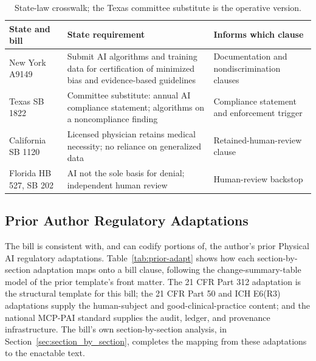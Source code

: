 \begin{table}[ht]
\centering
\begin{tabularx}{\textwidth}{L{2.6cm} Y L{3.3cm}}
\toprule
\textbf{State and bill} & \textbf{State requirement} & \textbf{Informs which clause} \\
\midrule
New York A9149 \cite{ny-a9149} & Submit AI algorithms and training data for certification of minimized bias and evidence-based guidelines & Documentation and nondiscrimination clauses \\
Texas SB 1822 \cite{tx-sb1822} & Committee substitute: annual AI compliance statement; algorithms on a noncompliance finding & Compliance statement and enforcement trigger \\
California SB 1120 \cite{ca-sb1120} & Licensed physician retains medical necessity; no reliance on generalized data & Retained-human-review clause \\
Florida HB 527, SB 202 \cite{fl-hb527} & AI not the sole basis for denial; independent human review & Human-review backstop \\
\bottomrule
\end{tabularx}
\caption{State-law crosswalk; the Texas committee substitute is the operative version.}
\label{tab:prior-state}
\end{table}

\subsection{Prior Author Regulatory Adaptations}

The bill is consistent with, and can codify portions of, the author's prior
Physical AI regulatory adaptations. Table~\ref{tab:prior-adapt} shows how each
section-by-section adaptation maps onto a bill clause, following the
change-summary-table model of the prior template's front matter. The 21 CFR Part
312 adaptation is the structural template for this bill; the 21 CFR Part 50 and
ICH E6(R3) adaptations supply the human-subject and good-clinical-practice
content; and the national MCP-PAI standard supplies the audit, ledger, and
provenance infrastructure. The bill's own section-by-section analysis, in
Section~\ref{sec:section_by_section}, completes the mapping from these adaptations
to the enactable text.

